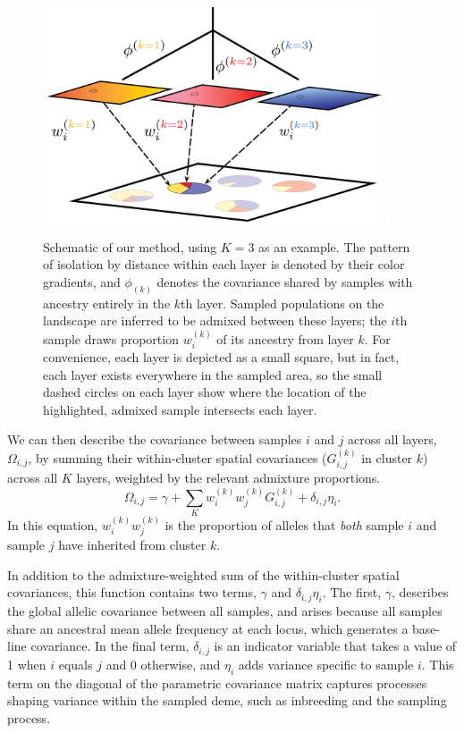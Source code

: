 \documentclass[12pt]{article}
\begin{document}
\begin{figure}
	\centering
		{\includegraphics[width=4in,height=2.5in]{figs/schematic/method_schematic.png}}
		\caption{Schematic of our method, using $K=3$ as an example.
			     The pattern of isolation by distance within each layer is denoted by their color gradients, 
			     and $\phi_{(k)}$ denotes the covariance shared by samples with ancestry entirely in the $k$th layer.
			     Sampled populations on the landscape are inferred to be admixed between these layers; 
			     the $i$th sample draws proportion $w^{(k)}_i$ of its ancestry from layer $k$.
			     For convenience, each layer is depicted as a small square, but in fact, 
			     each layer exists everywhere in the sampled area,
			     so the small dashed circles on each layer show where 
			     the location of the highlighted, admixed sample intersects each layer.
			    }\label{schematic}
\end{figure}

We can then describe the covariance between samples $i$ and $j$ across all layers, $\Omega_{i,j}$,
by summing their within-cluster spatial covariances ($G_{i,j}^{(k)}$ in cluster $k$) across all $K$ layers,
weighted by the relevant admixture proportions.
\begin{equation}
\Omega_{i,j} = \gamma + \sum\limits_K w^{(k)}_i w^{(k)}_j
G^{(k)}_{i,j} + \delta_{i,j}\eta_i .
\label{cross_cluster_covariance}
\end{equation}
In this equation, $w^{(k)}_i w^{(k)}_j$ is the proportion of alleles that \emph{both}
sample $i$ and sample $j$ have inherited from cluster $k$.

In addition to the admixture-weighted sum of the within-cluster spatial covariances,
this function contains two terms, $\gamma$ and $\delta_{i,j}\eta_i$.
The first, $\gamma$, describes the global allelic covariance between all samples, 
and arises because all samples share an ancestral mean allele frequency at each locus,
which generates a base-line covariance.
In the final term, $\delta_{i,j}$ is an indicator variable that takes a value of 1 when $i$ equals $j$ and 0 otherwise,
and $\eta_i$ adds variance specific to sample $i$.
This term on the diagonal of the parametric covariance matrix captures processes shaping variance within the sampled deme, 
such as inbreeding and the sampling process.
\end{document}
